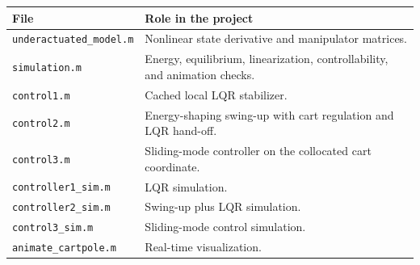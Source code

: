 \documentclass[11pt,a4paper]{article}
\begin{document}
\begin{center}
\begin{tabular}{@{}L{0.26\textwidth}L{0.63\textwidth}@{}}
\toprule
\textbf{File} & \textbf{Role in the project}\\
\midrule
\texttt{underactuated\_model.m} & Nonlinear state derivative and manipulator matrices.\\
\texttt{simulation.m} & Energy, equilibrium, linearization, controllability, and animation checks.\\
\texttt{control1.m} & Cached local LQR stabilizer.\\
\texttt{control2.m} & Energy-shaping swing-up with cart regulation and LQR hand-off.\\
\texttt{control3.m} & Sliding-mode controller on the collocated cart coordinate.\\
\texttt{controller1\_sim.m} & LQR simulation.\\
\texttt{controller2\_sim.m} & Swing-up plus LQR simulation.\\
\texttt{control3\_sim.m} & Sliding-mode control simulation.\\
\texttt{animate\_cartpole.m} & Real-time visualization.\\
\bottomrule
\end{tabular}
\end{center}
\end{document}
